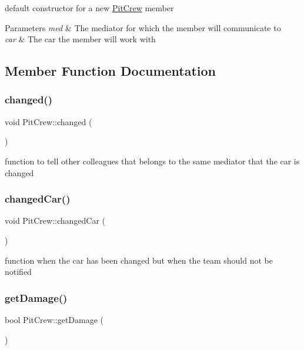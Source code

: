 default constructor for a new \mbox{\hyperlink{class_pit_crew}{Pit\+Crew}} member 
\begin{DoxyParams}{Parameters}
{\em med} & The mediator for which the member will communicate to \\
\hline
{\em car} & The car the member will work with \\
\hline
\end{DoxyParams}


\subsection{Member Function Documentation}
\mbox{\label{class_pit_crew_a3d3613895533476934ba89ed592b5c6a}} 
\subsubsection{\texorpdfstring{changed()}{changed()}}
{\footnotesize\ttfamily void Pit\+Crew\+::changed (\begin{DoxyParamCaption}{ }\end{DoxyParamCaption})}

function to tell other colleagues that belongs to the same mediator that the car is changed \mbox{\label{class_pit_crew_a973e77f91c6110a1f6bda3ef71385b6e}} 
\subsubsection{\texorpdfstring{changed\+Car()}{changedCar()}}
{\footnotesize\ttfamily void Pit\+Crew\+::changed\+Car (\begin{DoxyParamCaption}{ }\end{DoxyParamCaption})}

function when the car has been changed but when the team should not be notified \mbox{\label{class_pit_crew_a0cd6a3161f5b016241b3a6a51d526c4f}} 
\subsubsection{\texorpdfstring{get\+Damage()}{getDamage()}}
{\footnotesize\ttfamily bool Pit\+Crew\+::get\+Damage (\begin{DoxyParamCaption}{ }\end{DoxyParamCaption})\hspace{0.3cm}{\ttfamily [virtual]}}

